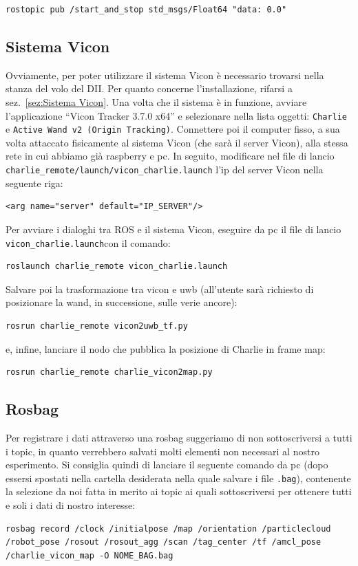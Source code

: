 \begin{lstlisting}[style=bash]
	rostopic pub /start_and_stop std_msgs/Float64 "data: 0.0"
\end{lstlisting}

\subsection{Sistema Vicon}
\label{sez: lancio del sistema vicon}
Ovviamente, per poter utilizzare il sistema Vicon è necessario trovarsi nella stanza del volo del DII. 
Per quanto concerne l'installazione, rifarsi a sez.~\ref{sez:Sistema Vicon}. 
Una volta che il sistema è in funzione, avviare l'applicazione ``Vicon Tracker 3.7.0 x64'' e selezionare nella lista oggetti: \texttt{Charlie} e 
\texttt{Active Wand v2 (Origin Tracking)}. 
Connettere poi il computer fisso, a sua volta attaccato fisicamente al sistema Vicon (che sarà il server Vicon), alla stessa rete in cui abbiamo già
raspberry e pc. In seguito, modificare nel file di lancio \texttt{charlie\_remote/launch/vicon\_charlie.launch} l'ip del server Vicon nella seguente riga:
\begin{lstlisting}[style=xml, firstnumber=6]
	<arg name="server" default="IP_SERVER"/>
\end{lstlisting}

Per avviare i dialoghi tra ROS e il sistema Vicon, eseguire da pc il file di lancio \verb|vicon_charlie.launch|con il comando:
\begin{lstlisting}[style=bashPC]
	roslaunch charlie_remote vicon_charlie.launch
\end{lstlisting}

Salvare poi la trasformazione tra vicon e uwb (all'utente sarà richiesto di posizionare la wand, in successione, sulle verie ancore):
\begin{lstlisting}[style=bashPC]
	rosrun charlie_remote vicon2uwb_tf.py
\end{lstlisting}

e, infine, lanciare il nodo che pubblica la posizione di Charlie in frame map:
\begin{lstlisting}[style=bashPC]
	rosrun charlie_remote charlie_vicon2map.py
\end{lstlisting}


\subsection{Rosbag}
\label{Guida breve all'esperimento: Rosbag}
Per registrare i dati attraverso una rosbag suggeriamo di non sottoscriversi a tutti i topic, in quanto verrebbero salvati molti elementi non necessari 
al nostro esperimento. Si consiglia quindi di lanciare il seguente comando da pc (dopo essersi spostati nella cartella desiderata nella quale salvare i 
file \verb|.bag|), contenente la selezione da noi fatta in merito ai topic ai quali sottoscriversi per ottenere tutti e soli i dati di nostro interesse:
\begin{lstlisting}[style=bashPC]
	rosbag record /clock /initialpose /map /orientation /particlecloud /robot_pose /rosout /rosout_agg /scan /tag_center /tf /amcl_pose /charlie_vicon_map -O NOME_BAG.bag
\end{lstlisting}

